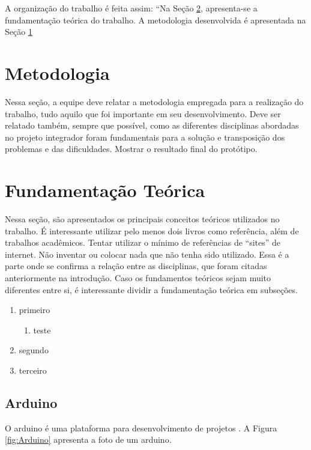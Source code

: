 \documentclass{article}
\begin{document}
A organização do trabalho é feita assim: “Na Seção \ref{sec:fundamentacao}, apresenta-se a fundamentação teórica do trabalho. A metodologia desenvolvida é apresentada na Seção \ref{metodologia}



\section{Metodologia}
\label{metodologia}

Nessa seção, a equipe deve relatar a metodologia empregada para a realização do trabalho, tudo aquilo que foi importante em seu desenvolvimento. Deve ser relatado também, sempre que possível, como as diferentes disciplinas abordadas no projeto integrador foram fundamentais para a solução e transposição dos problemas e das dificuldades. Mostrar o resultado final do protótipo.

\section{Fundamentação Teórica}
\label{sec:fundamentacao}

Nessa seção, são apresentados os principais conceitos teóricos utilizados no trabalho. É interessante utilizar pelo menos dois livros como referência, além de trabalhos acadêmicos. Tentar utilizar o mínimo de referências de “sites” de internet. Não inventar ou colocar nada que não tenha sido utilizado. Essa é a parte onde se confirma a relação entre as disciplinas, que foram citadas anteriormente na introdução. Caso os fundamentos teóricos sejam muito diferentes entre si, é interessante dividir a fundamentação teórica em subseções.

\begin{enumerate}
    \item primeiro
    \begin{enumerate}
        \item teste
    \end{enumerate}
    \item segundo
    \item terceiro
\end{enumerate}





\subsection{Arduino}

O arduino é uma plataforma para desenvolvimento de projetos \cite{LivroArduino}. A Figura \ref{fig:Arduino} apresenta a foto de um arduino.
\end{document}
